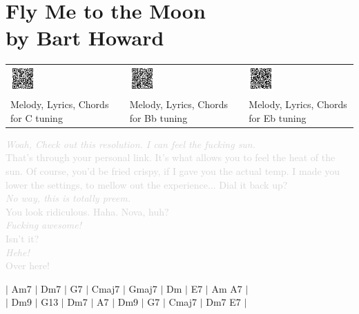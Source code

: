 \chapter[Fly Me to the Moon]{Fly Me to the Moon \\[1ex]\large{by Bart Howard}}


\begin{tabular}{p{} p{} p{}  p{} p{}}
  \includegraphics[width=0.25\textwidth]{QR_Codes/QR_FlyMeToTheMoon_C.png}
  &
  &
  \includegraphics[width=0.25\textwidth]{QR_Codes/QR_FlyMeToTheMoon_Bb.png}
  &
  &
  \includegraphics[width=0.25\textwidth]{QR_Codes/QR_FlyMeToTheMoon_Eb.png}\\                                                     
   Melody, Lyrics, Chords for C tuning
   &
   &
   Melody, Lyrics, Chords for Bb tuning
   &
   &
   Melody, Lyrics, Chords for Eb tuning\\
\end{tabular}


\textcolor{lightgray}{\textit{Woah, Check out this resolution. I can feel the fucking sun.}\\ 
That's through your personal link. It's what allows you to feel the heat of the sun. Of course, you'd be fried crispy, if I gave you the actual temp. I made you lower the settings, to mellow out the experience... Dial it back up?\\
\textit{No way, this is totally preem.}\\
You look ridiculous. Haha. Nova, huh?\\
\textit{Fucking awesome!}\\
Isn't it?\\
\textit{Hehe!}\\
Over here!\\}

$|$ Am7 $|$ Dm7 $|$ G7 $|$ Cmaj7 $|$ Gmaj7 $|$ Dm $|$ E7 $|$ Am A7 $|$\\


$|$ Dm9 $|$ G13 $|$ Dm7 $|$ A7 $|$ Dm9 $|$ G7 $|$ Cmaj7 $|$ Dm7 E7 $|$

